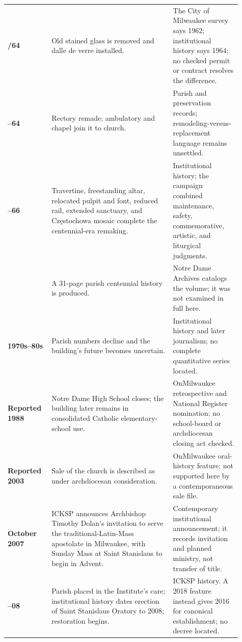 \begin{longtable}{>{\bfseries\RaggedRight\arraybackslash}p{0.16\linewidth}>{\RaggedRight\arraybackslash}p{0.48\linewidth}>{\RaggedRight\arraybackslash}p{0.27\linewidth}}
1962/64 & Old stained glass is removed and dalle de verre installed. & The City of Milwaukee survey says 1962; institutional history says 1964; no checked permit or contract resolves the difference.\\

1963--64 & Rectory remade; ambulatory and chapel join it to church. & Parish and preservation records; remodeling-versus-replacement language remains unsettled.\\

1965--66 & Travertine, freestanding altar, relocated pulpit and font, reduced rail, extended sanctuary, and Częstochowa mosaic complete the centennial-era remaking. & Institutional history; the campaign combined maintenance, safety, commemorative, artistic, and liturgical judgments.\\

1966 & A 31-page parish centennial history is produced. & Notre Dame Archives catalogs the volume; it was not examined in full here.\\

1970s--80s & Parish numbers decline and the building's future becomes uncertain. & Institutional history and later journalism; no complete quantitative series located.\\

Reported 1988 & Notre Dame High School closes; the building later remains in consolidated Catholic elementary-school use. & OnMilwaukee retrospective and National Register nomination; no school-board or archdiocesan closing act checked.\\

Reported 2003 & Sale of the church is described as under archdiocesan consideration. & 2014 OnMilwaukee oral-history feature; not supported here by a contemporaneous sale file.\\

15 October 2007 & ICKSP announces Archbishop Timothy Dolan's invitation to serve the traditional-Latin-Mass apostolate in Milwaukee, with Sunday Mass at Saint Stanislaus to begin in Advent. & Contemporary institutional announcement; it records invitation and planned ministry, not transfer of title.\\

2007--08 & Parish placed in the Institute's care; institutional history dates erection of Saint Stanislaus Oratory to 2008; restoration begins. & ICKSP history. A 2018 feature instead gives 2016 for canonical establishment; no decree located.\\


\end{longtable}
